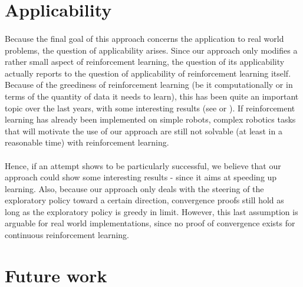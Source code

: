 \documentclass[a4paper]{report}
\begin{document}
{{		\section{Applicability}
		{
			\paragraph{} Because the final goal of this approach concerns the application to real world problems, the question of applicability arises. Since our approach only modifies a rather small aspect of reinforcement learning, the question of its applicability actually reports to the question of applicability of reinforcement learning itself. Because of the greediness of reinforcement learning (be it computationally or in terms of the quantity of data it needs to learn), this has been quite an important topic over the last years, with some interesting results (see \cite{hester2017learning} or \cite{fastrlslowrl}). If reinforcement learning has already been implemented on simple robots, complex robotics tasks that will motivate the use of our approach are still not solvable (at least in a reasonable time) with reinforcement learning. 
			
			\paragraph{} Hence, if an attempt shows to be particularly successful, we believe that our approach could show some interesting results - since it aims at speeding up learning. Also, because our approach only deals with the steering of the exploratory policy toward a certain direction, convergence proofs still hold as long as the exploratory policy is greedy in limit. However, this last assumption is arguable for real world implementations, since no proof of convergence exists for continuous reinforcement learning. 
		}
		\section{Future work}
		{
}}}
\end{document}
